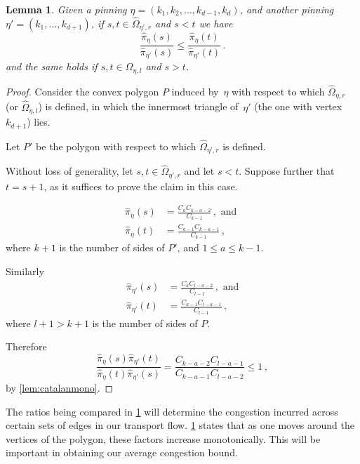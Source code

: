 \documentclass[a4paper, 12p]{article}
\numberwithin{equation}{section}
\newcommand{\Omorproj}{\hat{\Omega}}
\newcommand{\piorproj}{\hat{\pi}}
\newtheorem{lemma}[theorem]{Lemma}
\begin{document}
\begin{lemma}
    Given a pinning $\eta = (k_1, k_2, \dots, k_{d-1}, k_d)$, and another pinning $\eta' = (k_1, \dots, k_{d+1})$, if $s, t \in \Omorproj_{\eta', r}$ and $s < t$  we have
    \[
        \frac{\piorproj_{\eta}(s)}{\piorproj_{\eta'}(s)} \leq \frac{\piorproj_{\eta}(t)}{\piorproj_{\eta'}(t)}\,.
    \]
    and the same holds if $s, t \in \Omorproj_{\eta, l}$ and $s > t$.
    \label{lem:pimono}
\end{lemma}
\begin{proof}
    Consider the convex polygon $P$ induced by~$\eta$ with respect to which $\Omorproj_{\eta, r}$ (or $\Omorproj_{\eta, l}$) is defined, in which the innermost triangle of~$\eta'$ (the one with vertex~$k_{d+1}$) lies.

    Let $P'$ be the polygon with respect to which $\Omorproj_{\eta', r}$ is defined.
    
    Without loss of generality, let $s,t \in \Omorproj_{\eta', r}$ and let $s < t$. Suppose further that $t = s + 1$, as it suffices to prove the claim in this case.

    \begin{align*}
        \piorproj_{\eta}(s) &= \frac{C_{a}C_{k-a-2}}{C_{k-1}}\,, \mbox{ and }\\
        \piorproj_{\eta}(t) &= \frac{C_{a-1}C_{k-a-1}}{C_{k-1}}\,,
    \end{align*}
    where $k + 1$ is the number of sides of $P'$, and $1 \leq a \leq k - 1$.

    Similarly
    \begin{align*}
        \piorproj_{\eta'}(s) &= \frac{C_{a}C_{l-a-2}}{C_{l-1}}\,, \mbox{ and}\\
        \piorproj_{\eta'}(t) &= \frac{C_{a-1}C_{l-a-1}}{C_{l-1}}\,,
    \end{align*}
    where $l + 1 > k + 1$ is the number of sides of $P$.

    Therefore
    \begin{equation*}
        \frac{\piorproj_{\eta}(s)\piorproj_{\eta'}(t)}{\piorproj_{\eta}(t)\piorproj_{\eta'}(s)} = \frac{C_{k-a-2}C_{l-a-1}}{C_{k-a-1}C_{l-a-2}} \leq 1 \,,
    \end{equation*}
    by \cref{lem:catalanmono}.
\end{proof}

The ratios being compared in \cref{lem:pimono} will determine the congestion incurred across certain sets of edges in our transport flow. \cref{lem:pimono} states that as one moves around the vertices of the polygon, these factors increase monotonically. This will be important in obtaining our average congestion bound.
\end{document}
